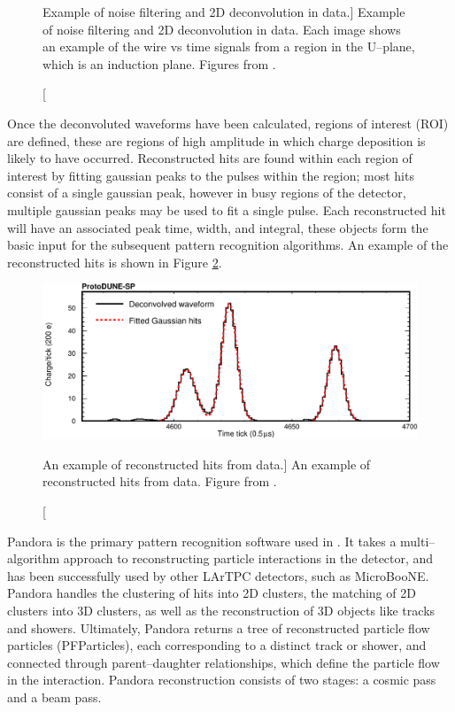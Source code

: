 \begin{figure}
	\caption
	[Example of noise filtering and 2D deconvolution in \protodune{} data.]
	{Example of noise filtering and 2D deconvolution in \protodune{} data. Each
	image shows an example of the wire vs time signals from a region in the
	U--plane, which is an induction plane. Figures from \cite{protoduneperf}.}

	\label{fig:2d_deconv}

\end{figure}

Once the deconvoluted waveforms have been calculated, regions of interest (ROI) 
are defined, these are regions of high amplitude in which charge deposition is
likely to have occurred. Reconstructed hits are found within each region of
interest by fitting gaussian peaks to the pulses within the region; most hits
consist of a single gaussian peak, however in busy regions of the detector,
multiple gaussian peaks may be used to fit a single pulse. Each reconstructed
hit will have an associated peak time, width, and integral, these objects form
the basic input for the subsequent pattern recognition algorithms. An example of
the reconstructed hits is shown in Figure \ref{fig:gaushit}.

\begin{figure}

	\centering

	\includegraphics[width=\textwidth]{figures/gaushit.pdf}

	\caption
	[An example of reconstructed hits from \protodune{} data.]
	{An example of reconstructed hits from \protodune{} data. Figure from 
	\cite{protoduneperf}.}

	\label{fig:gaushit}

\end{figure}

Pandora\cite{Marshall2015} is the primary pattern recognition software used in
\protodune{}. It takes a multi--algorithm approach to reconstructing particle
interactions in the detector, and has been successfully used by other LArTPC
detectors, such as MicroBooNE\cite{Acciarri:2017hat}. Pandora handles the 
clustering of hits into 2D clusters, the matching of 2D clusters into 3D
clusters, as well as the reconstruction of 3D objects like tracks and 
showers. Ultimately, Pandora returns a tree of reconstructed particle flow
particles (PFParticles), each corresponding to a distinct track or shower, and 
connected through parent--daughter relationships, which define the particle flow
in the interaction. Pandora reconstruction consists of two stages: a cosmic 
pass and a beam pass. 


